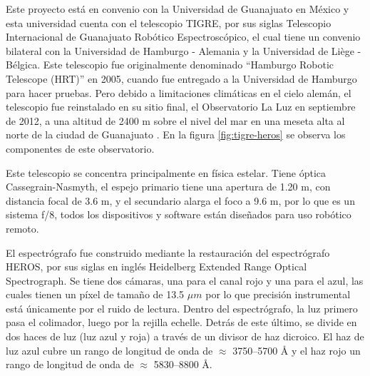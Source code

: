 \documentclass[12pt,oneside,openany,letter]{book}
\begin{document}
Este proyecto está en convenio con la Universidad de Guanajuato en México y esta universidad cuenta con el telescopio TIGRE, por sus siglas Telescopio Internacional de Guanajuato Robótico Espectroscópico, el cual tiene un convenio bilateral con la Universidad de Hamburgo - Alemania y la Universidad de Liège - Bélgica. Este telescopio fue originalmente denominado ``Hamburgo Robotic Telescope  (HRT)'' en 2005, cuando fue entregado a la Universidad de Hamburgo para hacer pruebas. Pero debido a limitaciones climáticas en el cielo alemán, el telescopio fue reinstalado en su sitio final, el Observatorio La Luz en septiembre de 2012, a una altitud de 2400 m sobre el nivel del mar en una meseta alta al norte de la ciudad de Guanajuato \citep{schmitt2014tigre}. En la figura \ref{fig:tigre-heros} se observa los componentes de este observatorio.

\noindent Este telescopio se concentra principalmente en física estelar. Tiene óptica Cassegrain-Nasmyth, el espejo primario tiene una apertura de 1.20 m, con distancia focal de 3.6 m, y el secundario alarga el foco a 9.6 m, por lo que es un sistema f/8, todos los dispositivos y software están diseñados para uso robótico remoto.

\noindent El espectrógrafo fue construido mediante la restauración del espectrógrafo HEROS, por sus siglas en inglés Heidelberg Extended Range Optical Spectrograph. Se tiene dos cámaras, una para el canal rojo y una para el azul, las cuales tienen un píxel de tamaño de 13.5 $\mu m$ por lo que precisión instrumental está únicamente por el ruido de lectura. Dentro del espectrógrafo, la luz primero pasa el colimador, luego por la rejilla echelle. Detrás de este último, se divide en dos haces de luz (luz azul y roja) a través de un divisor de haz dicroico.  El haz de luz azul cubre un rango de longitud de onda de $\approx$ 3750–5700 \r{A} y el haz rojo un rango de longitud de onda de $\approx$ 5830–8800 \r{A}.
\end{document}
